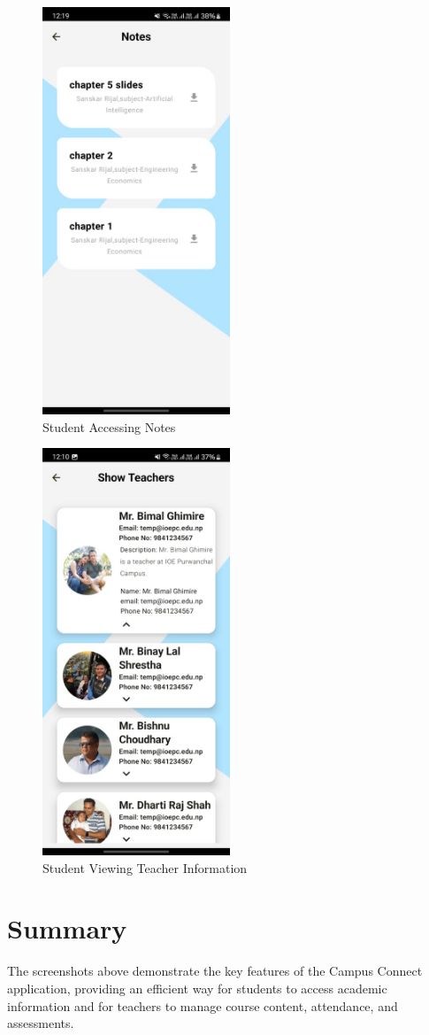 \begin{figure}[H]
    \centering
    \includegraphics[width=0.5\textwidth]{Graphics/output/student_notes.jpg}
    \caption{Student Accessing Notes}
    \label{fig:student_notes}
\end{figure}

\begin{figure}[H]
    \centering
    \includegraphics[width=0.5\textwidth]{Graphics/output/student_view_teachers.jpg}
    \caption{Student Viewing Teacher Information}
    \label{fig:student_view_teachers}
\end{figure}

\section{Summary}
The screenshots above demonstrate the key features of the Campus Connect application, providing an efficient way for students to access academic information and for teachers to manage course content, attendance, and assessments.
